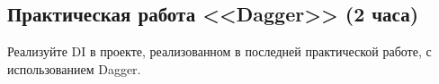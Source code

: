 \subsection{Практическая работа <<Dagger>> (2 часа)} 
Реализуйте DI в проекте, реализованном в последней практической работе, с использованием Dagger.

